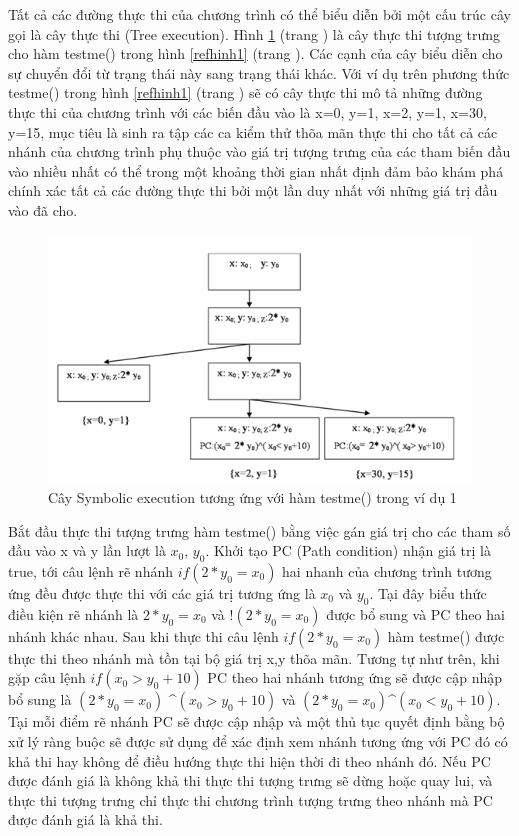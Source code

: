 \documentclass[12pt,a4paper]{article}
\begin{document}
\indent Tất cả các đường thực thi của chương trình có thể biểu diễn bởi một cấu trúc cây gọi là cây thực thi (Tree execution). Hình \ref{refhinh2} (trang \pageref{refhinh2}) là cây thực thi tượng trưng cho hàm testme() trong hình \ref{refhinh1} (trang \pageref{refhinh1}). Các cạnh của cây biểu diễn cho sự chuyển đổi từ trạng thái này sang trạng thái khác. Với ví dụ trên phương thức testme() trong hình \ref{refhinh1} (trang \pageref{refhinh1}) sẽ có cây thực thi mô tả những đường thực thi của chương trình với các biến đầu vào là {x=0, y=1}, {x=2, y=1}, {x=30, y=15}, mục tiêu là sinh ra tập các ca kiểm thử thõa mãn thực thi cho tất cả các nhánh của chương trình phụ thuộc vào giá trị tượng trưng của các tham biến đầu vào nhiều nhất có thể trong một khoảng thời gian nhất định đảm bảo khám phá chính xác tất cả các đường thực thi bởi một lần duy nhất với những giá trị đầu vào đã cho.

\begin{figure}[ht]
\begin{center}
\includegraphics[scale=0.9]{hinhanh/hinh2}
\end{center}
\caption{Cây Symbolic execution tương ứng với hàm testme() trong ví dụ 1}
\label{refhinh2}
\end{figure}

\indent Bắt đầu thực thi tượng trưng hàm testme() bằng việc gán giá trị cho các tham số đầu vào x và y lần lượt là \textit{$x_0$}, \textit{$y_0$}. Khởi tạo PC (Path condition) nhận giá trị là true, tới câu lệnh rẽ nhánh \textit{$if(2*y_0=x_0)$} hai nhanh của chương trình tương ứng đều được thực thi với các giá trị tương ứng là \textit{$x_0$} và \textit{$y_0$}. Tại đây biểu thức điều kiện rẽ nhánh là \textit{$2*y_0=x_0$} và \textit{$!(2*y_0=x_0)$} được bổ sung và PC theo hai nhánh khác nhau. Sau khi thực thi câu lệnh \textit{$if(2*y_0=x_0)$} hàm testme() được thực thi theo nhánh mà tồn tại bộ giá trị x,y thõa mãn. Tương tự như trên, khi gặp câu lệnh \textit{$if(x_0>y_0+10)$} PC theo hai nhánh tương ứng sẽ được cập nhập bổ sung là \textit{$(2*y_0=x_0)$} \^ {}\textit{$(x_0>y_0+10)$} và \textit{$(2*y_0=x_0)$}\^{}\textit{$(x_0<y_0+10)$}. Tại mỗi điểm rẽ nhánh PC sẽ được cập nhập và một thủ tục quyết định bằng bộ xử lý ràng buộc sẽ được sử dụng để xác định xem nhánh tương ứng với PC đó có khả thi hay không để điều hướng thực thi hiện thời đi theo nhánh đó. Nếu PC được đánh giá là không khả thi thực thi tượng trưng sẽ dừng hoặc quay lui, và thực thi tượng trưng chỉ thực thi chương trình tượng trưng theo nhánh mà PC được đánh giá là khả thi.
\end{document}
